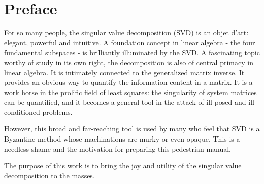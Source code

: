 \chapter*{Preface}

For so many people, the singular value decomposition (SVD) is an objet d'art: elegant, powerful and intuitive. A foundation concept in linear algebra - the four fundamental subspaces - is brilliantly illuminated by the SVD. A fascinating topic worthy of study in its own right, the decomposition is also of central primacy in linear algebra. It is intimately connected to the generalized matrix inverse. It provides an obvious way to quantify the information content in a matrix. It is a work horse in the prolific field of least squares: the singularity of system matrices can be quantified, and it becomes a general tool in the attack of ill-posed and ill-conditioned problems.

However, this broad and far-reaching tool is used by many who feel that SVD is a Byzantine method whose machinations are murky or even opaque. This is a needless shame and the motivation for preparing this pedestrian manual.

The purpose of this work is to bring the joy and utility of the singular value decomposition to the masses.

